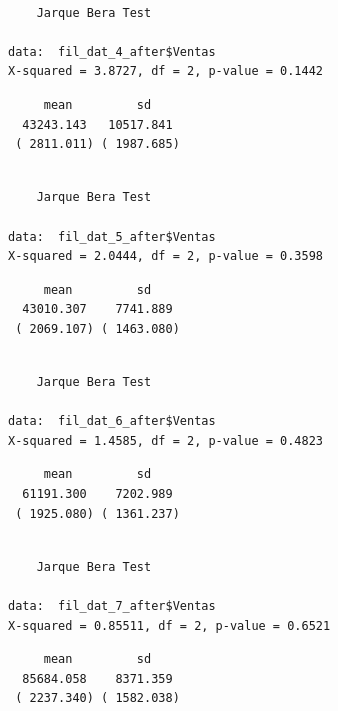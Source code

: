 \documentclass[
  us-letterpaper,
]{scrreprt}
\newenvironment{Shaded}{\begin{snugshade}}{\end{snugshade}}
\newcommand{\CommentTok}[1]{\textcolor[rgb]{0.37,0.37,0.37}{#1}}
\newcommand{\FunctionTok}[1]{\textcolor[rgb]{0.28,0.35,0.67}{#1}}
\newcommand{\NormalTok}[1]{\textcolor[rgb]{0.00,0.23,0.31}{#1}}
\newcommand{\SpecialCharTok}[1]{\textcolor[rgb]{0.37,0.37,0.37}{#1}}
\theoremstyle{definition}
\theoremstyle{plain}
\theoremstyle{plain}
\theoremstyle{remark}
\begin{document}
\begin{verbatim}

    Jarque Bera Test

data:  fil_dat_4_after$Ventas
X-squared = 3.8727, df = 2, p-value = 0.1442
\end{verbatim}

\begin{verbatim}
     mean         sd    
  43243.143   10517.841 
 ( 2811.011) ( 1987.685)
\end{verbatim}

\begin{verbatim}

    Jarque Bera Test

data:  fil_dat_5_after$Ventas
X-squared = 2.0444, df = 2, p-value = 0.3598
\end{verbatim}

\begin{verbatim}
     mean         sd    
  43010.307    7741.889 
 ( 2069.107) ( 1463.080)
\end{verbatim}

\begin{verbatim}

    Jarque Bera Test

data:  fil_dat_6_after$Ventas
X-squared = 1.4585, df = 2, p-value = 0.4823
\end{verbatim}

\begin{verbatim}
     mean         sd    
  61191.300    7202.989 
 ( 1925.080) ( 1361.237)
\end{verbatim}

\begin{verbatim}

    Jarque Bera Test

data:  fil_dat_7_after$Ventas
X-squared = 0.85511, df = 2, p-value = 0.6521
\end{verbatim}

\begin{verbatim}
     mean         sd    
  85684.058    8371.359 
 ( 2237.340) ( 1582.038)
\end{verbatim}

\begin{Shaded}
\end{Shaded}
\end{document}
